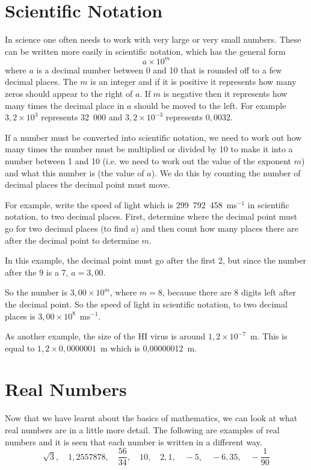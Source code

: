 \documentclass[10pt,a4paper,titlepage,twoside,openright]{report}
\begin{document}
\section{Scientific Notation}
In science one often needs to work with very large or very small numbers. These
can be written more easily in scientific notation, which has the general form
\begin{equation}
\label{mn:a:sci}
a \times 10^m
\end{equation}
where $a$ is a decimal number between 0 and 10 that is rounded off to a few
decimal places. The $m$ is an integer and if it is positive it represents how
many zeros should appear to the right of $a$. If $m$ is negative then it
represents how many times the decimal place in $a$ should be moved to the left.
For example $3,2\times 10^3$ represents 32~000 and $3,2\times 10^{-3}$ represents
$0,0032$.

If a number must be converted into scientific notation, we need to work out how
many times the number must be multiplied or divided by 10 to make it into a
number between 1 and 10 (i.e. we need to work out the value of the exponent $m$)
and what this number is (the value of $a$). We do this by counting the number of
decimal places the decimal point must move. 

For example, write the speed of light which is 299~792~458~ms$^{-1}$ in
scientific notation, to two decimal places. First, determine where the decimal
point must go for two decimal places (to find $a$) and then count how many
places there are after the decimal point to determine $m$.

In this example, the decimal point must go after the first 2, but since the
number after the 9 is a 7, $a=3,00$. 

So the number is $3,00 \times 10^{m}$, where $m=8$, because there are 8 digits
left after the decimal point. So the speed of light in scientific notation, to
two decimal places is $3,00 \times 10^{8} $~ms$^{-1}$.

As another example, the size of the HI virus is around $1,2\times10^{-7}$~m.
This is equal to $1,2\times 0,0000001$~m which is 0,00000012~m.


\section{Real Numbers}
Now that we have learnt about the basics of mathematics, we can look at what
real numbers are in a little more detail. The following are examples of real
numbers and it is seen that each number is written in a different way. 
\begin{equation}
\sqrt{3},\quad 1,2557878,\quad \frac{56}{34},\quad 10,\quad 2,1,\quad -5,\quad
-6,35, \quad -\frac{1}{90}
\end{equation}
\end{document}
